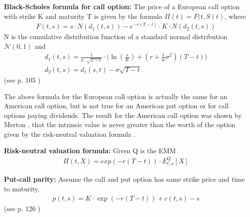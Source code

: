 \theoremstyle{proposition}
\begin{proposition}{}\label{BS-price-EuroCall}
\textbf{Black-Scholes formula for call option:} The price of a European call option with strike K and maturity T is given by the formula  $\Pi(t)=F(t,S(t)$, where
\begin{align*}
F(t,s)=s \cdot N(d_1(t,s)) - e^{-r(T-t)}\cdot K \cdot N(d_2(t,s))
\end{align*}
N is the cumulative distribution function of a standard normal distribution $\mathcal{N}(0,1)$ and
\begin{align*}
d_1(t,s)=\frac{1}{\sigma\cdot \sqrt{T-t}} \cdot \bigg( \ln(\frac{s}{K}) + (r+\frac{1}{w} \sigma^2) (T-t) \bigg)\\
d_2(t,s)=d_1(s,t)-\sigma \sqrt{T-t}
\end{align*}
(see p. 105 \parencite{	finKont})
\end{proposition}


The above formula for the European call option is actually the same for an American call option, but is not true for an American put option or for call options paying dividends. The result for the American call option was shown by Merton \parencite{Merton73}, that the intrinsic value is never greater than the worth of the option given by the risk-neutral valuation formula \parencite{finKont}.



\begin{theorem}\label{RNVF}
\textbf{Risk-neutral valuation formula:} Given Q is the EMM
\begin{align}
\Pi(t, X)= exp(-r(T-t))\cdot E_{t,x}^Q[X]
\end{align}
\end{theorem}


\theoremstyle{proposition}
\begin{proposition}{}\label{Put-call-parity}
\textbf{Put-call parity:} 
Assume the call and put option has same strike price and time to maturity.
\begin{align*}
p(t,s)=K\cdot \exp(-r(T-t))+c(t,s)-s
\end{align*}
(see p. 126 \parencite{finKont})
\end{proposition}


